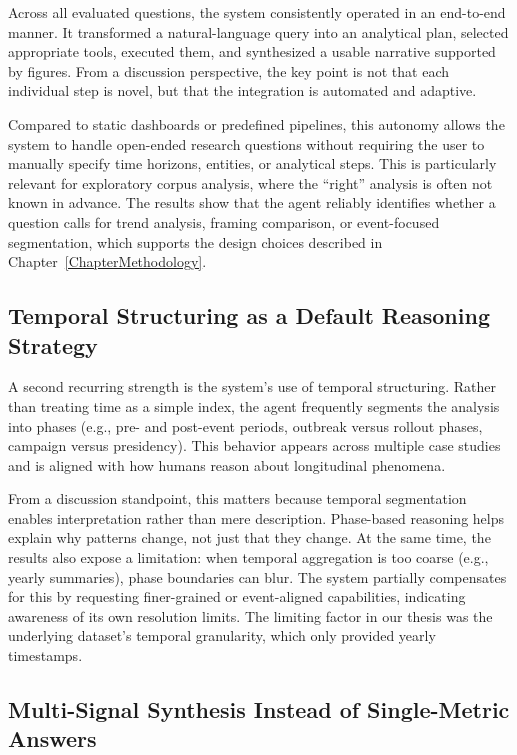 Across all evaluated questions, the system consistently operated in an end-to-end manner. It transformed a natural-language query into an analytical plan, selected appropriate tools, executed them, and synthesized a usable narrative supported by figures. From a discussion perspective, the key point is not that each individual step is novel, but that the integration is automated and adaptive.

Compared to static dashboards or predefined pipelines, this autonomy allows the system to handle open-ended research questions without requiring the user to manually specify time horizons, entities, or analytical steps. This is particularly relevant for exploratory corpus analysis, where the “right” analysis is often not known in advance. The results show that the agent reliably identifies whether a question calls for trend analysis, framing comparison, or event-focused segmentation, which supports the design choices described in Chapter~\ref{ChapterMethodology}.

\subsection{Temporal Structuring as a Default Reasoning Strategy}

A second recurring strength is the system’s use of temporal structuring. Rather than treating time as a simple index, the agent frequently segments the analysis into phases (e.g., pre- and post-event periods, outbreak versus rollout phases, campaign versus presidency). This behavior appears across multiple case studies and is aligned with how humans reason about longitudinal phenomena.

From a discussion standpoint, this matters because temporal segmentation enables interpretation rather than mere description. Phase-based reasoning helps explain why patterns change, not just that they change. At the same time, the results also expose a limitation: when temporal aggregation is too coarse (e.g., yearly summaries), phase boundaries can blur. The system partially compensates for this by requesting finer-grained or event-aligned capabilities, indicating awareness of its own resolution limits. The limiting factor in our thesis was the underlying dataset's temporal granularity, which only provided yearly timestamps.

\subsection{Multi-Signal Synthesis Instead of Single-Metric Answers}

